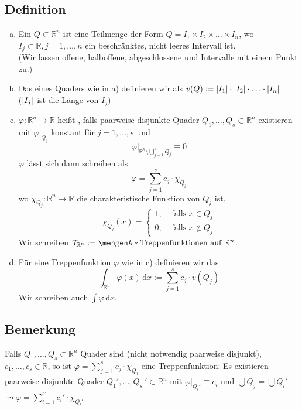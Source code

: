 \subsection[Definition: Quader, Volumen, Treppenfunktion]{Definition} %
\label{sub:31}
\begin{enumerate}[a)]
	\item Ein  $Q \subset \mathds{R}^n$ ist eine Teilmenge der Form $Q = I_1 \times I_2 \times \ldots \times I_n$, wo $I_j \subset \mathds{R}, j=1,\ldots ,n$
	ein beschränktes, nicht leeres Intervall ist. \\
	(Wir lassen offene, halboffene, abgeschlossene und Intervalle mit einem Punkt zu.)
	\item Das  eines Quaders wie in a) definieren wir als $v(Q) := \abs*{I_1} \cdot \abs*{I_2} \cdot \ldots \cdot \abs*{I_n}$ \\
	($\abs*{I_j} $ ist die Länge von $I_j$)
	\item $\varphi : \mathds{R}^n \to \mathds{R}$ heißt , falls paarweise disjunkte Quader $Q_1, \ldots , Q_s \subset \mathds{R}^n$ existieren mit
	$\varphi|_{Q_j}$ konstant für $j=1, \ldots ,s$ und 
	\[
		\varphi\Big|_{\mathds{R}^n \setminus \bigcup_{j=1}^s Q_j} \equiv 0
	\]
	$\varphi$ lässt sich dann schreiben als
	\[
		\varphi = \sum_{j=1}^{s} c_j \cdot \chi_{Q_j}
	\]
	wo $\chi_{Q_j} : \mathds{R}^n \to \mathds{R}$ die charakteristische Funktion von $Q_j$ ist, 
	\[
		\chi_{Q_j}(x) = \begin{cases}
			1, &\text{ falls }x \in Q_j\\
			0, &\text{ falls }x \not\in Q_j 
		\end{cases}
	\]
	Wir schreiben $\mathcal{T}_{\mathds{R}^n} := \set{\text{Treppenfunktionen auf }\mathds{R}^n} $.
	\item Für eine Treppenfunktion $\varphi$ wie in c) definieren wir das 
	\[
		\int_{\mathds{R}^n} \! \varphi(x)  \, \mathrm{d}x  :=  \sum_{j=1}^{s} c_j \cdot v(Q_j)
	\]
	Wir schreiben auch $\int\! \varphi  \, \mathrm{d}x$.
\end{enumerate}

\subsection[Bemerkung: Zerlegung von Quadern in disjunkte Quader]{Bemerkung} %
\label{sub:32}
Falls $Q_1, \ldots , Q_s \subset \mathds{R}^n$ Quader sind (nicht notwendig paarweise disjunkt), $c_1, \ldots , c_s \in \mathds{R}$, so ist 
$\varphi = \sum_{j=1}^{s} c_j \cdot \chi_{Q_j}$ eine Treppenfunktion: Es existieren paarweise disjunkte Quader $Q_1', \ldots , Q_{s'}' \subset \mathds{R}^n$ mit
$\varphi|_{Q_i'} \equiv c_i$ und $\bigcup Q_j = \bigcup Q_i'$ $\leadsto \varphi = \sum_{i=1}^{s'} c_i' \cdot \chi_{Q_i'}$

